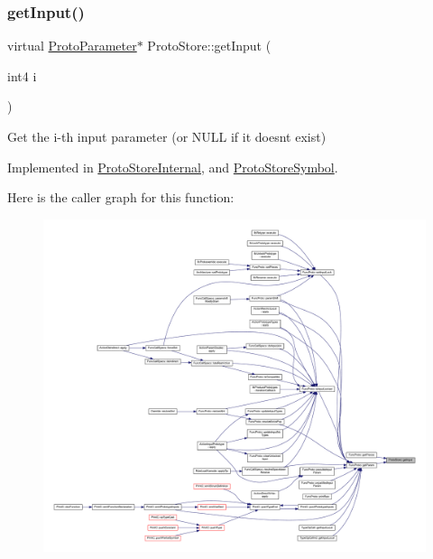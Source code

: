 \subsubsection{\texorpdfstring{getInput()}{getInput()}}
{\footnotesize\ttfamily virtual \mbox{\hyperlink{class_proto_parameter}{Proto\+Parameter}}$\ast$ Proto\+Store\+::get\+Input (\begin{DoxyParamCaption}\item[{int4}]{i }\end{DoxyParamCaption})\hspace{0.3cm}{\ttfamily [pure virtual]}}



Get the i-\/th input parameter (or N\+U\+LL if it doesn\textquotesingle{}t exist) 



Implemented in \mbox{\hyperlink{class_proto_store_internal_ab637f859e1c4553e24d4651836ce7c84}{Proto\+Store\+Internal}}, and \mbox{\hyperlink{class_proto_store_symbol_a55788c21f1b3699731f1956d75ef1d45}{Proto\+Store\+Symbol}}.

Here is the caller graph for this function\+:
\nopagebreak
\begin{figure}[H]
\begin{center}
\leavevmode
\includegraphics[width=350pt]{class_proto_store_a97623d0ed5720f94d7c671edccbd9142_icgraph}
\end{center}
\end{figure}
\mbox{\label{class_proto_store_a641e1b680e3a7c67b65a964d06d60187}} 
